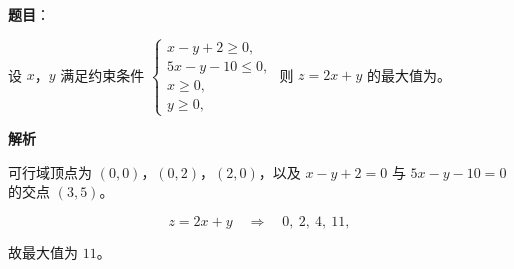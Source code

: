 \begin{answer}

\textbf{题目}：

设 $x$，$y$ 满足约束条件 $\begin{cases}x-y+2\geqslant0,\\ 5x-y-10\leqslant0,\\ x\geqslant0,\\ y\geqslant0,\end{cases}$ 则 $z=2x+y$ 的最大值为\gkblank{}。

\textbf{解析}

可行域顶点为 $(0,0)$，$(0,2)$，$(2,0)$，以及 $x-y+2=0$ 与 $5x-y-10=0$ 的交点 $(3,5)$。

\nopagebreak[4]
\[z=2x+y\quad\Rightarrow\quad 0,\ 2,\ 4,\ 11,\]

故最大值为 $11$。


\end{answer}
